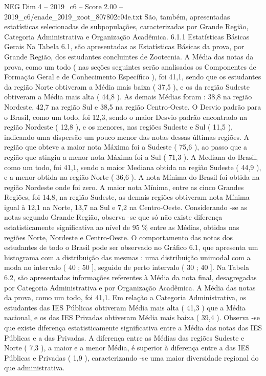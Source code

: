 \begin{textsample}{NEG Dim 4 – 2019\_c6 – Score 2.00 – 2019\_c6/enade\_2019\_zoot\_807802c04e.txt}
São, também, apresentadas estatísticas selecionadas de subpopulações, caracterizadas por Grande Região, Categoria Administrativa e Organização Acadêmica. 6.1.1 Estatísticas Básicas Gerais Na Tabela 6.1, são apresentadas as Estatísticas Básicas da prova, por Grande Região, dos estudantes concluintes de Zootecnia.
A Média das notas da prova, como um todo ( nas seções seguintes serão analisados os Componentes de Formação Geral e de Conhecimento Específico ), foi 41,1, sendo que os estudantes da região Norte obtiveram a Média mais baixa ( 37,5 ), e os da região Sudeste obtiveram a Média mais alta ( 44,8 ).
As demais Médias foram : 38,8 na região Nordeste, 42,7 na região Sul e 38,5 na região Centro-Oeste.
O Desvio padrão para o Brasil, como um todo, foi 12,3, sendo o maior Desvio padrão encontrado na região Nordeste ( 12,8 ), e os menores, nas regiões Sudeste e Sul ( 11,5 ), indicando uma dispersão um pouco menor das notas dessas últimas regiões.
A região que obteve a maior nota Máxima foi a Sudeste ( 75,6 ), ao passo que a região que atingiu a menor nota Máxima foi a Sul ( 71,3 ).
A Mediana do Brasil, como um todo, foi 41,1, sendo a maior Mediana obtida na região Sudeste ( 44,9 ), e a menor obtida na região Norte ( 36,6 ).
A nota Mínima do Brasil foi obtida na região Nordeste onde foi zero.
A maior nota Mínima, entre as cinco Grandes Regiões, foi 14,8, na região Sudeste, as demais regiões obtiveram nota Mínima igual à 12,1 na Norte, 13,7 na Sul e 7,2 na Centro-Oeste.
Considerando -se as notas segundo Grande Região, observa -se que só não existe diferença estatisticamente significativa ao nível de 95 \% entre as Médias, obtidas nas regiões Norte, Nordeste e Centro-Oeste.
O comportamento das notas dos estudantes de todo o Brasil pode ser observado no Gráfico 6.1, que apresenta um histograma com a distribuição das mesmas : uma distribuição unimodal com a moda no intervalo ( 40 ; 50 ], seguido de perto intervalo ( 30 ; 40 ].
Na Tabela 6.2, são apresentadas informações referentes à Média da nota final, desagregadas por Categoria Administrativa e por Organização Acadêmica.
A Média das notas da prova, como um todo, foi 41,1.
Em relação a Categoria Administrativa, os estudantes das IES Públicas obtiveram Média mais alta ( 41,3 ) que a Média nacional, e os das IES Privadas obtiveram Média mais baixa ( 39,4 ).
Observa -se que existe diferença estatisticamente significativa entre a Média das notas das IES Públicas e a das Privadas.
A diferença entre as Médias das regiões Sudeste e Norte ( 7,3 ), a maior e a menor Média, é superior à diferença entre a das IES Públicas e Privadas ( 1,9 ), caracterizando -se uma maior diversidade regional do que administrativa.

\end{textsample}
